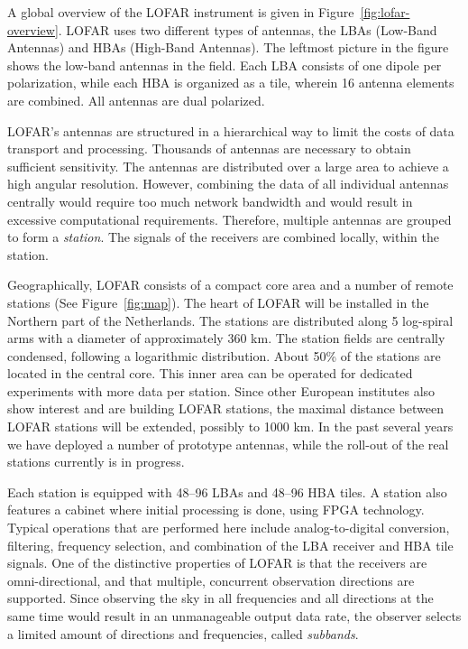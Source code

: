 \documentclass{sig-alternate}
\begin{document}
A global overview of the LOFAR instrument is given in
Figure~\ref{fig:lofar-overview}. LOFAR uses two different types of
antennas, the LBAs (Low-Band Antennas) and HBAs (High-Band Antennas).
The leftmost picture in the figure shows the low-band
antennas in the field.  Each LBA consists of one dipole per polarization,
while each HBA is organized as a tile, wherein 16 antenna elements are
combined. All antennas are dual polarized.

LOFAR's antennas are structured in a hierarchical way to limit the
costs of data transport and processing. Thousands of antennas are
necessary to obtain sufficient sensitivity. The antennas are
distributed over a large area to achieve a high angular resolution.
However, combining the data of all individual antennas centrally would
require too much network bandwidth and would result in excessive
computational requirements. Therefore, multiple antennas are grouped
to form a \emph{station}.
The signals of the receivers are combined locally, within the station.

Geographically, LOFAR consists of a compact core area and a number of
remote stations (See Figure~\ref{fig:map}).  The heart of LOFAR will be installed in the Northern
part of the Netherlands.  The stations are distributed along 5
log-spiral arms with a diameter of approximately 360 km. The station
fields are centrally condensed, following a logarithmic distribution.
About 50\% of the stations are located in the central core. This inner
area can be operated for dedicated experiments with more data per
station.  Since other European institutes also show interest and are
building LOFAR stations, the maximal distance between LOFAR stations will be
extended, possibly to 1000 km.  In the past several years we have
deployed a number of prototype antennas, while the roll-out of
the real stations currently is in progress.

Each station is equipped with 48--96 LBAs and 48--96 HBA tiles. 
A station also features a cabinet where initial processing is done, using
FPGA technology.
Typical operations that are performed here include analog-to-digital
conversion, filtering, frequency selection, and combination of the LBA
receiver and HBA tile signals.
One of the distinctive properties of LOFAR is that the receivers are
omni-directional, and that multiple, concurrent observation directions are
supported.
Since observing the sky in all frequencies and all directions at the same time
would result in an unmanageable output data rate, the observer selects a
limited amount of directions and frequencies, called \emph{subbands}.
\end{document}
